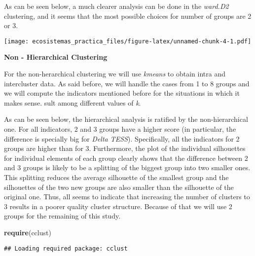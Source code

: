 \documentclass[]{article}
\newenvironment{Shaded}{\begin{snugshade}}{\end{snugshade}}
\newcommand{\KeywordTok}[1]{\textcolor[rgb]{0.13,0.29,0.53}{\textbf{#1}}}
\newcommand{\NormalTok}[1]{#1}
\begin{document}
As can be seen below, a much clearer analysis can be done in the
\emph{ward.D2} clustering, and it seems that the most possible choices
for number of groups are 2 or 3.

\texttt{[image: ecosistemas\_practica\_files/figure-latex/unnamed-chunk-4-1.pdf]}

\textbf{Non - Hierarchical Clustering}

For the non-herarchical clustering we will use \emph{kmeans} to obtain
intra and intercluster data. As said before, we will handle the cases
from 1 to 8 groups and we will compute the indicators mentioned before
for the situations in which it makes sense. sult among different values
of \emph{k}.

As can be seen below, the hierarchical analysis is ratified by the
non-hierarchical one. For all indicators, 2 and 3 groups have a higher
score (in particular, the difference is specially big for \emph{Delta
TESS}). Specifically, all the indicators for 2 groups are higher than
for 3. Furthermore, the plot of the individual silhouettes for
individual elements of each group clearly shows that the difference
between 2 and 3 groups is likely to be a splitting of the biggest group
into two smaller ones. This splitting reduces the average silhouette of
the smallest group and the silhouettes of the two new groups are also
smaller than the silhouette of the original one. Thus, all seems to
indicate that increasing the number of clusters to 3 results in a poorer
quality cluster structure. Because of that we will use 2 groups for the
remaining of this study.

\begin{Shaded}
\begin{Highlighting}[]
\KeywordTok{require}\NormalTok{(cclust)}
\end{Highlighting}
\end{Shaded}

\begin{verbatim}
## Loading required package: cclust
\end{verbatim}
\end{document}
